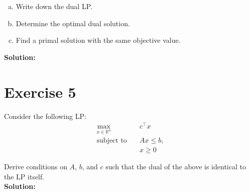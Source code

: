 \documentclass{article}
\begin{document}
\begin{enumerate}[(a)]
    \item Write down the dual LP.
    \item Determine the optimal dual solution.
    \item Find a primal solution with the same objective value.
\end{enumerate}

\textbf{Solution:}



\newpage

\section*{Exercise 5}
Consider the following LP:
\begin{align*}
\max_{x \in \mathbb{R}^n} \quad & c^{\top} x \\
\text{subject to} \quad & Ax \leq b, \\
& x \geq 0
\end{align*}

Derive conditions on $A$, $b$, and $c$ such that the dual of the above is identical to the LP itself. \\

\textbf{Solution:}
\end{document}
